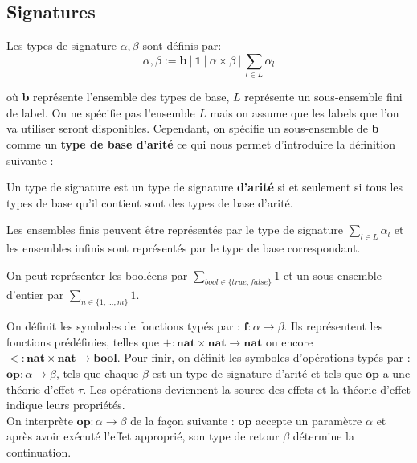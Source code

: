 \subsection{Signatures}

	Les types de signature $\alpha,\beta$ sont définis par:
	\[\alpha,\beta := \textbf{b}~|~\textbf{1}~|~\alpha \times \beta~|~\sum_{l \in L}\alpha_l\]
			
	où \textbf{b} représente l'ensemble des types de base, $L$ représente un sous-ensemble fini de label. On ne spécifie pas l'ensemble $L$ mais on assume que les labels que l'on va utiliser seront disponibles. Cependant, on spécifie un sous-ensemble de \textbf{b} comme un \textbf{type de base d'arité} ce qui nous permet d'introduire la définition suivante : 
	
	\begin{definition}
		Un type de signature est un type de signature \textbf{d'arité} si et seulement si tous les types de base qu'il contient sont des types de base d'arité.
	\end{definition}
	
	Les ensembles finis peuvent être représentés par le type de signature $\sum_{l \in L}\alpha_l$ et les ensembles infinis sont représentés par le type de base correspondant.
	
	\begin{exemple}
		On peut représenter les booléens par  $\sum_{bool \in \{true,false\}} 1$ et un sous-ensemble d'entier par $\sum_{n \in \{1,...,m\}} 1$.
	\end{exemple}

	On définit les symboles de fonctions typés par : $\textbf{f} : \alpha \rightarrow \beta$. Ils représentent les fonctions prédéfinies, telles que $+ : \textbf{nat} \times \textbf{nat} \rightarrow \textbf{nat}$ ou encore $< : \textbf{nat} \times \textbf{nat} \rightarrow \textbf{bool}$.
	\smallbreak
	Pour finir, on définit les symboles d'opérations typés par : $\textbf{op} : \alpha \rightarrow \beta$, tels que chaque $\beta$ est un type de signature d'arité et tels que $\textbf{op}$ a une théorie d'effet $\tau$. Les opérations deviennent la source des effets et la théorie d'effet indique leurs propriétés.
	\\
	On interprète $\textbf{op} : \alpha \rightarrow \beta$ de la façon suivante :
	$\textbf{op}$ accepte un paramètre $\alpha$ et après avoir exécuté l'effet approprié, son type de retour $\beta$ détermine la continuation.
	\medbreak
	
